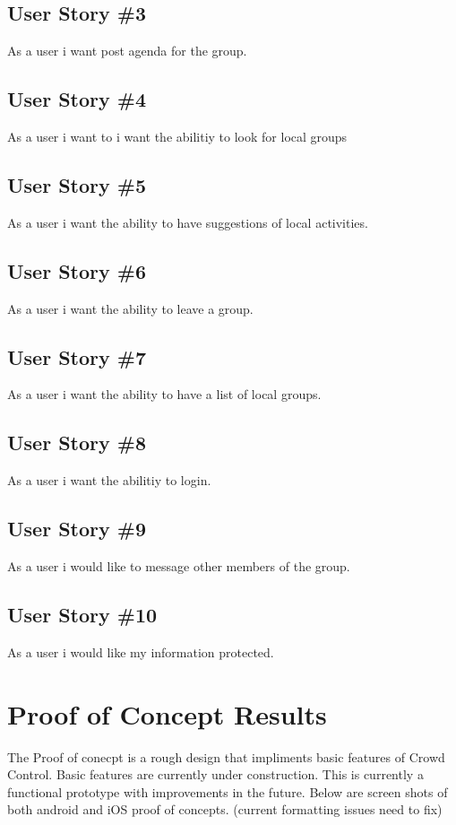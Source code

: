 \subsection{User Story \#3} 
As a user i want post agenda for the group.

\subsection{User Story \#4} 
As a user i want to i want the abilitiy to look for local groups

\subsection{User Story \#5} 
As a user i want the ability to have suggestions of local activities.

\subsection{User Story \#6} 
As a user i want the ability to leave a group.

\subsection{User Story \#7} 
As a user i want the ability to have a list of local groups.

\subsection{User Story \#8} 
As a user i want the abilitiy to login.

\subsection{User Story \#9}
As a user i would like to message other members of the group.

\subsection{User Story \#10} 
As a user i would like my information protected. 

\section{Proof of Concept Results}
The Proof of conecpt is a rough design that impliments basic features of Crowd Control. Basic features are currently under construction. This is currently a functional prototype with improvements in the future.
\newline 
\newline
Below are screen shots of both android and iOS proof of concepts.
(current formatting issues need to fix)
